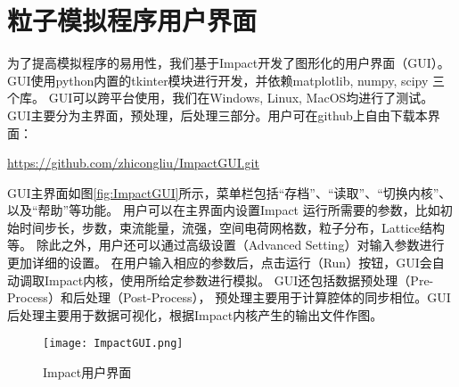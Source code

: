 
\chapter{粒子模拟程序用户界面}

为了提高模拟程序的易用性，我们基于Impact\cite{PIC_ji2000}开发了图形化的用户界面（GUI）。
GUI使用python内置的tkinter模块进行开发，并依赖matplotlib, numpy, scipy 三个库。
GUI可以跨平台使用，我们在Windows, Linux, MacOS均进行了测试。
GUI主要分为主界面，预处理，后处理三部分。用户可在github上自由下载本界面：

\begin{center}
  \href{https://github.com/zhicongliu/ImpactGUI.git}{https://github.com/zhicongliu/ImpactGUI.git}
\end{center}

GUI主界面如图\eqref{fig:ImpactGUI}所示，菜单栏包括“存档”、“读取”、“切换内核”、以及“帮助”等功能。
用户可以在主界面内设置Impact 运行所需要的参数，比如初始时间步长，步数，束流能量，流强，空间电荷网格数，粒子分布，Lattice结构等。
除此之外，用户还可以通过高级设置（Advanced Setting）对输入参数进行更加详细的设置。
在用户输入相应的参数后，点击运行（Run）按钮，GUI会自动调取Impact内核，使用所给定参数进行模拟。
GUI还包括数据预处理（Pre-Process）和后处理（Post-Process），
预处理主要用于计算腔体的同步相位。GUI后处理主要用于数据可视化，根据Impact内核产生的输出文件作图。

\begin{figure}
  \centering
  \texttt{[image: ImpactGUI.png]}
  \caption{Impact用户界面}\label{fig:ImpactGUI}
\end{figure}


